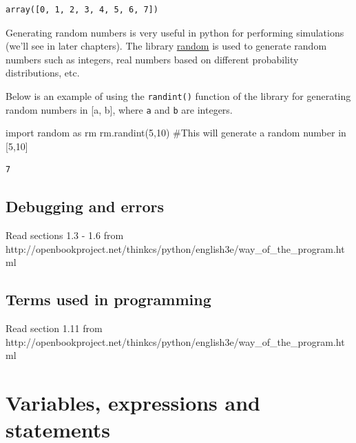 \documentclass[
  letterpaper,
  DIV=11,
  numbers=noendperiod]{scrreprt}
\newenvironment{Shaded}{\begin{snugshade}}{\end{snugshade}}
\newcommand{\CommentTok}[1]{\textcolor[rgb]{0.37,0.37,0.37}{#1}}
\newcommand{\DecValTok}[1]{\textcolor[rgb]{0.68,0.00,0.00}{#1}}
\newcommand{\ImportTok}[1]{\textcolor[rgb]{0.00,0.46,0.62}{#1}}
\newcommand{\NormalTok}[1]{\textcolor[rgb]{0.00,0.23,0.31}{#1}}
\begin{document}
\begin{verbatim}
array([0, 1, 2, 3, 4, 5, 6, 7])
\end{verbatim}

Generating random numbers is very useful in python for performing
simulations (we'll see in later chapters). The library
\href{https://docs.python.org/3/library/random.html}{random} is used to
generate random numbers such as integers, real numbers based on
different probability distributions, etc.

Below is an example of using the \texttt{randint()} function of the
library for generating random numbers in {[}a, b{]}, where \texttt{a}
and \texttt{b} are integers.

\begin{Shaded}
\begin{Highlighting}[]
\ImportTok{import}\NormalTok{ random }\ImportTok{as}\NormalTok{ rm}
\NormalTok{rm.randint(}\DecValTok{5}\NormalTok{,}\DecValTok{10}\NormalTok{) }\CommentTok{\#This will generate a random number in [5,10]}
\end{Highlighting}
\end{Shaded}

\begin{verbatim}
7
\end{verbatim}

\hypertarget{debugging-and-errors}{%
\section{Debugging and errors}\label{debugging-and-errors}}

Read sections 1.3 - 1.6 from
http://openbookproject.net/thinkcs/python/english3e/way\_of\_the\_program.html

\hypertarget{terms-used-in-programming}{%
\section{Terms used in programming}\label{terms-used-in-programming}}

Read section 1.11 from
http://openbookproject.net/thinkcs/python/english3e/way\_of\_the\_program.html

\hypertarget{variables-expressions-and-statements}{%
\chapter{Variables, expressions and
statements}\label{variables-expressions-and-statements}}
\end{document}
